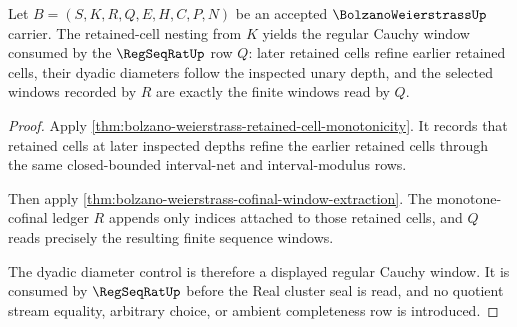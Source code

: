 \begin{theorem}
\label{thm:bolzano-weierstrass-cluster-cauchy-window}
Let $B=(S,K,R,Q,E,H,C,P,N)$ be an accepted $\BolzanoWeierstrassUp$ carrier. The retained-cell nesting from $K$ yields the regular Cauchy window consumed by the $\RegSeqRatUp$ row $Q$: later retained cells refine earlier retained cells, their dyadic diameters follow the inspected unary depth, and the selected windows recorded by $R$ are exactly the finite windows read by $Q$.
\end{theorem}
\begin{proof}
Apply \autoref{thm:bolzano-weierstrass-retained-cell-monotonicity}. It records that retained cells at later inspected depths refine the earlier retained cells through the same closed-bounded interval-net and interval-modulus rows.

Then apply \autoref{thm:bolzano-weierstrass-cofinal-window-extraction}. The monotone-cofinal ledger $R$ appends only indices attached to those retained cells, and $Q$ reads precisely the resulting finite sequence windows.

The dyadic diameter control is therefore a displayed regular Cauchy window. It is consumed by $\RegSeqRatUp$ before the Real cluster seal is read, and no quotient stream equality, arbitrary choice, or ambient completeness row is introduced.
\end{proof}

